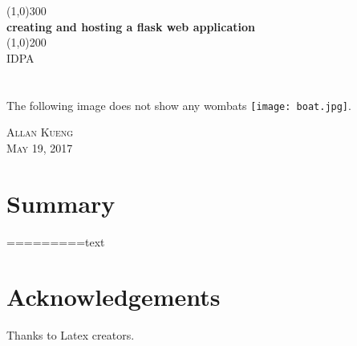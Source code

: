 \documentclass{article}
\begin{document}
\begin{titlepage}
    \begin{center}
    \line(1,0){300} \\ %
    [3mm]%
    \huge{\bfseries creating and hosting a flask web application} \\
    [2mm]%
    \line(1,0){200} \\ %
    [1.5cm]%
    \textsc{\LARGE IDPA} \\
    [0.75cm]
     \\
    \\

The following image does not show any wombats
\texttt{[image: boat.jpg]}.


    \end{center}
    \begin{flushright}
    \textsc{\large Allan Kueng\\
    May 19, 2017 \\}
    \end{flushright}
\end{titlepage}


\section*{Summary}
=========text
\cleardoublepage



\section*{Acknowledgements}
Thanks to Latex creators.
\end{document}
